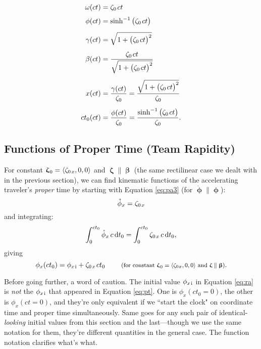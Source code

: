 \documentclass[12pt]{article}
\newcommand{\dd}[1]{\mathrm{d}#1}
\newcommand{\vvbeta}{\bm{\upbeta}}
\newcommand{\vvphi}{\bm{\upphi}}
\newcommand{\vvzeta}{\bm{\upzeta}}
\begin{document}
\begin{equation*}
\begin{aligned}
\omega (ct) &= \zeta_0 \mkern2mu ct \\[3pt]
\phi (ct) &= \sinh^{-1} \big( \zeta_0 \mkern2mu ct \big) \\[5pt]
\gamma (ct) &= \sqrt{1 + \big( \zeta_0 \mkern2mu ct \big)^2} \\[5pt]
\beta (ct) &= \dfrac{\zeta_0 \mkern2mu ct}{\sqrt{1 + \big( \zeta_0 \mkern2mu ct \big)^2}} \\[5pt]
x (ct) &= \dfrac{ \gamma (ct) }{ \zeta_0} = \dfrac{\sqrt{1 + \big( \zeta_0 \mkern2mu ct \big)^2}}{ \zeta_0} \\[5pt]
ct_0 (ct) &= \dfrac{ \phi (ct) }{ \zeta_0} = \dfrac{\sinh^{-1} \big( \zeta_0 \mkern2mu ct \big)}{ \zeta_0}.
\end{aligned}
\end{equation*}


\subsection{Functions of Proper Time (Team Rapidity)}

For constant $\vvzeta_{\mkern1mu 0} = \langle \zeta_{0 \mkern2mu x} , 0, 0 \rangle$ and $\vvzeta \parallel \vvbeta$ (the same rectilinear case we dealt with in the previous section), we can find kinematic functions of the accelerating traveler's \emph{proper} time by starting with Equation \ref{eq:pa3} (for $\mathring{\vvphi} \parallel \vvphi$):
\begin{equation*}
\mathring{\phi}_x = \zeta_{0 \mkern2mu x}
\end{equation*}
and integrating:
\begin{equation*}
\int_0^{ct_0} \mathring{\phi}_x \, c \, \dd t_0 = \int_0^{ct_0}  \zeta_{0 \mkern2mu x} \, c \, \dd t _0 ,
\end{equation*}
giving
\begin{equation}\label{eq:ra}
\phi_x (ct_0) = \phi_{x \mkern2mu \textrm{i} } + \zeta_{0 \mkern2mu x} \mkern2mu ct_0 \qquad \textrm{\footnotesize{ (for constant $\vvzeta_{\mkern1mu 0} = \langle \zeta_{0 \mkern1mu x} , 0, 0 \rangle$ and $\vvzeta \parallel \vvbeta$)}}.
\end{equation}

Before going further, a word of caution. The initial value $\phi_{x \mkern2mu \textrm{i} }$ in Equation \ref{eq:ra} is \emph{not} the $\phi_{x \mkern2mu \textrm{i} }$ that appeared in Equation \ref{eq:pt}. One is $\phi_x (ct_0 = 0)$, the other is $\phi_x (ct = 0)$, and they're only equivalent if we ``start the clock" on coordinate time and proper time simultaneously. Same goes for any such pair of identical-\emph{looking} initial values from this section and the last---though we use the same notation for them, they're different quantities in the general case. The function notation clarifies what's what.
\end{document}
